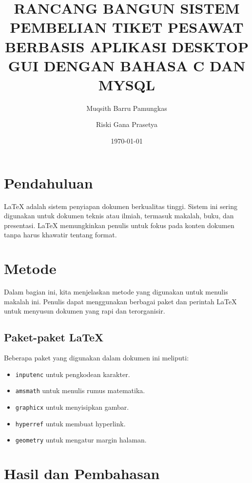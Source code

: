 \documentclass[a4paper,12pt]{report}
\title{RANCANG BANGUN SISTEM PEMBELIAN TIKET PESAWAT BERBASIS APLIKASI DESKTOP GUI DENGAN BAHASA C DAN MYSQL}
\author{{Muqsith Barru Pamungkas}\and
\date{\today}
{Riski Gana Prasetya}}
\begin{document}
\maketitle


\section{Pendahuluan}
\label{sec:intro}

LaTeX adalah sistem penyiapan dokumen berkualitas tinggi. Sistem ini sering digunakan untuk dokumen teknis atau ilmiah, termasuk makalah, buku, dan presentasi. LaTeX memungkinkan penulis untuk fokus pada konten dokumen tanpa harus khawatir tentang format.

\section{Metode}

Dalam bagian ini, kita menjelaskan metode yang digunakan untuk menulis makalah ini. Penulis dapat menggunakan berbagai paket dan perintah LaTeX untuk menyusun dokumen yang rapi dan terorganisir.

\subsection{Paket-paket LaTeX}
Beberapa paket yang digunakan dalam dokumen ini meliputi:
\begin{itemize}
    \item \texttt{inputenc} untuk pengkodean karakter.
    \item \texttt{amsmath} untuk menulis rumus matematika.
    \item \texttt{graphicx} untuk menyisipkan gambar.
    \item \texttt{hyperref} untuk membuat hyperlink.
    \item \texttt{geometry} untuk mengatur margin halaman.
\end{itemize}

\section{Hasil dan Pembahasan}
\end{document}
